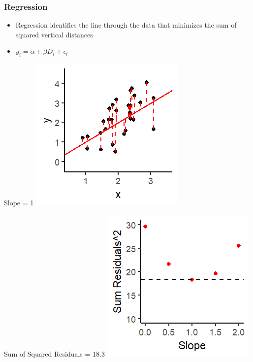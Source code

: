 \documentclass[xcolor=x11names,compress]{beamer}\usepackage[]{graphicx}\usepackage[]{color}
\makeatletter
\def\maxwidth{ %
  \ifdim\Gin@nat@width>\linewidth
    \linewidth
  \else
    \Gin@nat@width
  \fi
}
\newenvironment{knitrout}{}{} %
\renewcommand{\(}{\begin{columns}}
\renewcommand{\)}{\end{columns}}
\newcommand{\<}[1]{\begin{column}{#1}}
\renewcommand{\>}{\end{column}}
\makeatother
\begin{document}
\begin{frame}
\frametitle{Regression}
\begin{itemize}
\item Regression identifies the line through the data that minimizes the sum of squared vertical distances 
\item $y_i = \alpha + \beta D_i + \epsilon_i$
\end{itemize}
\begin{multicols}{2}
Slope = 1
\begin{knitrout}
\color{fgcolor}
\includegraphics[width=\maxwidth]{figure/graph_ols6-1} 

\end{knitrout}
\columnbreak
Sum of Squared Residuals = 18.3
\begin{knitrout}
\color{fgcolor}
\includegraphics[width=\maxwidth]{figure/graph_ssr6-1} 

\end{knitrout}
\end{multicols}
\end{frame}
\end{document}
